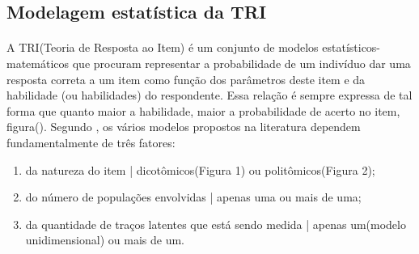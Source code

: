 	\subsection{Modelagem estatística da TRI}
	\paragraph{}
    	A TRI(Teoria de Resposta ao Item) é um conjunto de modelos estatísticos-matemáticos que procuram representar a probabilidade de um indivíduo dar uma resposta correta a um item como função dos parâmetros deste item e da habilidade (ou habilidades) do respondente. Essa relação é sempre expressa de tal forma que quanto maior a habilidade, maior a probabilidade de acerto no item, figura(). Segundo \textcite{Dalton}, os vários modelos propostos na literatura dependem fundamentalmente de três fatores:\\
    	\begin{enumerate}
    	    \item da natureza do item | dicotômicos(Figura 1) ou politômicos(Figura 2);
    	    \item do número de populações envolvidas | apenas uma ou mais de uma;
    	    \item da quantidade de traços latentes que está sendo medida | apenas um(modelo unidimensional) ou mais de um.
    	\end{enumerate}

